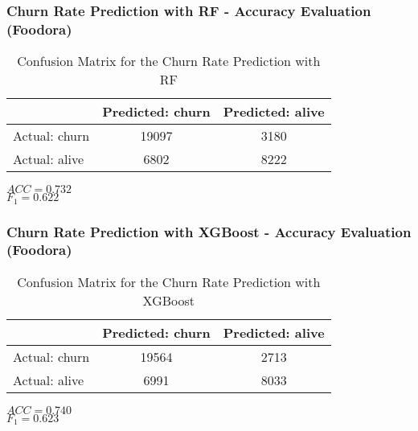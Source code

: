 \documentclass{beamer} %
\theoremstyle{definition} %
\begin{document}
\begin{frame}
\frametitle{Churn Rate Prediction with RF - Accuracy Evaluation (Foodora)}
\begin{center}
            \begin{table}
\begin{tabular}{l | c | c }
 & Predicted: churn & Predicted: alive\\
\hline \hline
Actual: churn & 19097 & 3180\\ 
Actual: alive & 6802 & 8222
\end{tabular}
\caption{Confusion Matrix for the Churn Rate Prediction with RF}
\end{table}
        \end{center}      
       
\begin{rmk}
	$ACC=0.732$ \\    
    $F_1=0.622$
\end{rmk}
\end{frame}

\begin{frame}
\frametitle{Churn Rate Prediction with XGBoost - Accuracy Evaluation (Foodora)}
\begin{center}
            \begin{table}
\begin{tabular}{l | c | c }
 & Predicted: churn & Predicted: alive\\
\hline \hline
Actual: churn & 19564 & 2713\\ 
Actual: alive & 6991 & 8033
\end{tabular}
\caption{Confusion Matrix for the Churn Rate Prediction with XGBoost}
\end{table}
        \end{center}      
       
\begin{rmk}
	$ACC=0.740$ \\    
    $F_1=0.623$
\end{rmk}
\end{frame}
\end{document}
